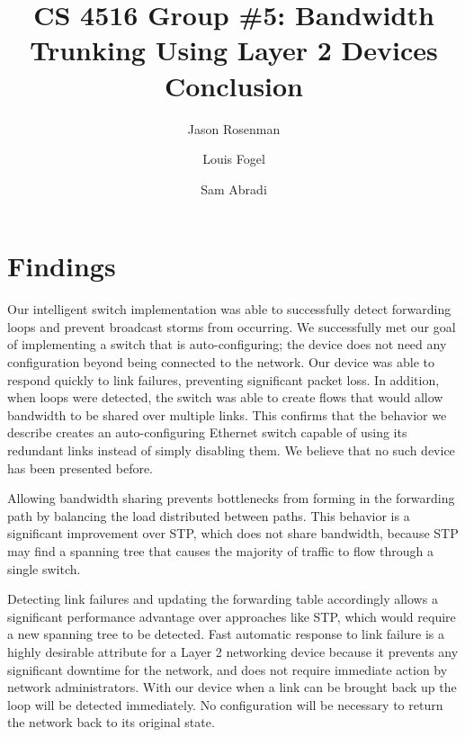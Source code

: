 \documentclass{article}
\title{CS 4516 Group \#5: Bandwidth Trunking Using Layer 2 Devices\\Conclusion}
\author{Jason Rosenman \and Louis Fogel \and Sam Abradi}
\date{}
\begin{document}
\maketitle
\section{Findings}
  Our intelligent switch implementation was able to successfully detect forwarding loops and prevent broadcast storms from occurring.
  We successfully met our goal of implementing a switch that is auto-configuring; the device does not need any configuration beyond being connected to the network.
  Our device was able to respond quickly to link failures, preventing significant packet loss.
  In addition, when loops were detected, the switch was able to create flows that would allow bandwidth to be shared over multiple links.
  This confirms that the behavior we describe creates an auto-configuring Ethernet switch capable of using its redundant links instead of simply disabling them.
  We believe that no such device has been presented before.
  
  Allowing bandwidth sharing prevents bottlenecks from forming in the forwarding path by balancing the load distributed between paths.
  This behavior is a significant improvement over STP, which does not share bandwidth, because STP may find a spanning tree that causes the majority of traffic to flow through a single switch.
  
  Detecting link failures and updating the forwarding table accordingly allows a significant performance advantage over approaches like STP, which would require a new spanning tree to be detected.
  Fast automatic response to link failure is a highly desirable attribute for a Layer 2 networking device because it prevents any significant downtime for the network, and does not require immediate action by network administrators.
  With our device when a link can be brought back up the loop will be detected immediately.
  No configuration will be necessary to return the network back to its original state.
\end{document}
